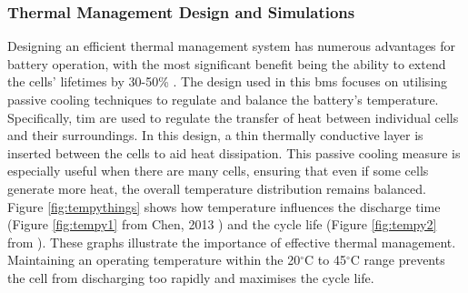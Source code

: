 \subsubsection{Thermal Management Design and Simulations}

Designing an efficient thermal management system has numerous advantages for battery operation, with the most significant benefit being the ability to extend the cells' lifetimes by 30-50\% \cite{TOGUN20251077}. The design used in this \gls{bms} focuses on utilising passive cooling techniques to regulate and balance the battery's temperature. Specifically, \gls{tim} are used to regulate the transfer of heat between individual cells and their surroundings. In this design, a thin thermally conductive layer is inserted between the cells to aid heat dissipation. This passive cooling measure is especially useful when there are many cells, ensuring that even if some cells generate more heat, the overall temperature distribution remains balanced. Figure \ref{fig:tempythings} shows how temperature influences the discharge time (Figure \ref{fig:tempy1} from Chen, 2013 \cite{chen2013heat}) and the cycle life (Figure \ref{fig:tempy2} from \cite{REZVANIZANIANI2014110}). These graphs illustrate the importance of effective thermal management. Maintaining an operating temperature within the 20$^\circ\text{C}$ to 45$^\circ\text{C}$ range prevents the cell from discharging too rapidly and maximises the cycle life.

